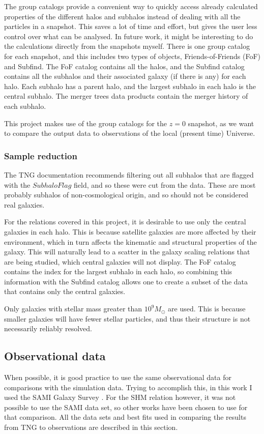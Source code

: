 The group catalogs provide a convenient way to quickly access already calculated properties of the different halos and subhalos instead of dealing with all the particles in a snapshot. This saves a lot of time and effort, but gives the user less control over what can be analysed. In future work, it might be interesting to do the calculations directly from the snapshots myself. There is one group catalog for each snapshot, and this includes two types of objects, Friends-of-Friends (FoF) and Subfind. The FoF catalog contains all the halos, and the Subfind catalog contains all the subhalos and their associated galaxy (if there is any) for each halo. Each subhalo has a parent halo, and the largest subhalo in each halo is the central subhalo. The merger trees data products contain the merger history of each subhalo.

This project makes use of the group catalogs for the $z = 0$ snapshot, as we want to compare the output data to observations of the local (present time) Universe.

\subsubsection{Sample reduction}

The TNG documentation recommends filtering out all subhalos that are flagged with the $SubhaloFlag$ field, and so these were cut from the data. These are most probably subhalos of non-cosmological origin, and so should not be considered real galaxies.

For the relations covered in this project, it is desirable to use only the central galaxies in each halo. This is because satellite galaxies are more affected by their environment, which in turn affects the kinematic and structural properties of the galaxy. This will naturally lead to a scatter in the galaxy scaling relations that are being studied, which central galaxies will not display. The FoF catalog contains the index for the largest subhalo in each halo, so combining this information with the Subfind catalog allows one to create a subset of the data that contains only the central galaxies.

Only galaxies with stellar mass greater than $10^9 M_{\odot}$ are used. This is because smaller galaxies will have fewer stellar particles, and thus their structure is not necessarily reliably resolved.

\subsection{Observational data}
When possible, it is good practice to use the same observational data for comparisons with the simulation data. Trying to accomplish this, in this work I used the SAMI Galaxy Survey \parencite{Bryant_2015}. For the SHM relation however, it was not possible to use the SAMI data set, so other works have been chosen to use for that comparison. All the data sets and best fits used in comparing the results from TNG to observations are described in this section.

